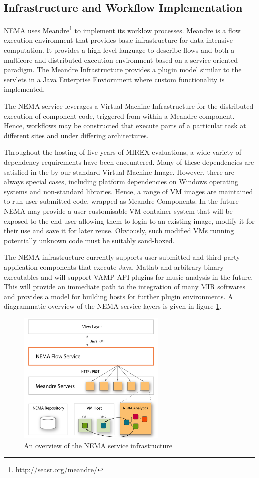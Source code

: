 \documentclass[conference]{IEEEtran}
\begin{document}
\subsection{Infrastructure and Workflow Implementation}
NEMA uses Meandre\footnote{\url{http://seasr.org/meandre/}} to implement its worklow processes. Meandre is a flow execution environment that provides basic infrastructure for data-intensive computation. It provides a high-level language to describe flows and both a multicore and distributed execution environment based on a service-oriented paradigm. The Meandre Infrastructure provides a plugin model similar to the servlets in a Java Enterprise Enviornment where custom functionality is implemented.

The NEMA service leverages a Virtual Machine Infrastructure for the distributed execution of component code, triggered from within a Meandre component. Hence, workflows may be constructed that execute parts of a particular task at different sites and under differing architectures.

Throughout the hosting of five years of MIREX evaluations, a wide variety of dependency requirements have been encountered. Many of these dependencies are satisfied in the by our standard Virtual Machine Image. However, there are always special cases, including platform dependencies on Windows operating systems and non-standard libraries. Hence, a range of VM images are maintained to run user submitted code, wrapped as Meandre Components.
In the future NEMA may provide a user customisable VM container system that will be exposed to the end user allowing them to login to an existing image, modify it for their use and save it for later reuse. Obviously, such modified VMs running potentially unknown code must be suitably sand-boxed.

The NEMA infrastructure currently supports user submitted and third party application components that execute Java, Matlab and arbitrary binary executables and will support VAMP API plugins \cite{cannam2006sonic} for music analysis in the future. This will provide an immediate path to the integration of many MIR softwares and provides a model for building hosts for further plugin environments. A diagrammatic overview of the NEMA service layers is given in figure \ref{fig_infrastructure}.

\begin{figure}[t]
\centering
\includegraphics[width=2.8in]{infrastructure}
  \caption{An overview of the NEMA service infrastructure}
\label{fig_infrastructure}
\end{figure}
\end{document}
